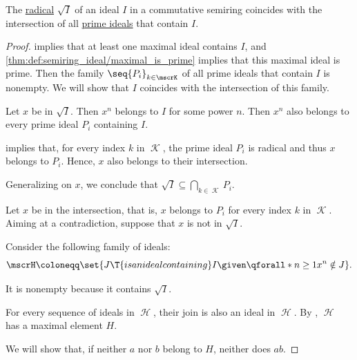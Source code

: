 \begin{proposition}\label{thm:radical_ideal_is_intersection}
  The \hyperref[def:radical_of_ideal]{radical} \( \sqrt I \) of an ideal \( I \) in a commutative semiring coincides with the intersection of all \hyperref[def:semiring_ideal/prime]{prime ideals} that contain \( I \).
\end{proposition}
\begin{proof}
    implies that at least one maximal ideal contains \( I \), and \cref{thm:def:semiring_ideal/maximal_is_prime} implies that this maximal ideal is prime. Then the family \( \seq{ P_i }_{k \in \mscrK} \) of all prime ideals that contain \( I \) is nonempty. We will show that \( I \) coincides with the intersection of this family.

   Let \( x \) be in \( \sqrt I \). Then \( x^n \) belongs to \( I \) for some power \( n \). Then \( x^n \) also belongs to every prime ideal \( P_i \) containing \( I \).

   implies that, for every index \( k \) in \( \mscrK \), the prime ideal \( P_i \) is radical and thus \( x \) belongs to \( P_i \). Hence, \( x \) also belongs to their intersection.

  Generalizing on \( x \), we conclude that \( \sqrt I \subseteq \bigcap_{k \in \mscrK} P_i \).

   Let \( x \) be in the intersection, that is, \( x \) belongs to \( P_i \) for every index \( k \) in \( \mscrK \). Aiming at a contradiction, suppose that \( x \) is not in \( \sqrt I \).

  Consider the following family of ideals:
  \begin{equation*}
    \mscrH \coloneqq \set{ J \T{is an ideal containing} I \given \qforall* {n \geq 1} x^n \notin J }.
  \end{equation*}

  It is nonempty because it contains \( \sqrt I \).

  For every sequence of ideals in \( \mscrH \), their join is also an ideal in \( \mscrH \). By , \( \mscrH \) has a maximal element \( H \).

   We will show that, if neither \( a \) nor \( b \) belong to \( H \), neither does \( ab \).


\end{proof}
